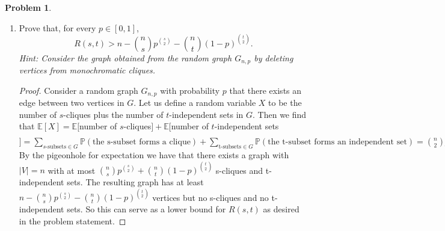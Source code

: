 \documentclass[11pt, letter]{amsart}
\theoremstyle{definition}
\newtheorem{problem}{Problem}[]
\newcommand{\p}[0]{\mathbb{P}}
\begin{document}
\begin{problem}
\begin{enumerate}[label=(\alph*)]
  \item\label{ramsey-deletion} Prove that, for every $p \in [0,1]$,
    \begin{equation*}
      R(s,t) > n - \binom{n}{s}p^{\binom{s}{2}} - \binom{n}{t}(1 - p)^{\binom{t}{2}}.
    \end{equation*}
    \textit{Hint: Consider the graph obtained from the random graph $G_{n,p}$ by deleting vertices from monochromatic cliques.}

    \begin{proof}
        Consider a random graph $G_{n, p}$ with probability $p$ that there exists an edge between two vertices in $G$. Let us define a random variable $X$ to be the number of $s$-cliques plus the number of $t$-independent sets in $G$. Then we find that $\mathbb{E}[X] = \mathbb{E}[$number of $s$-cliques$] + \mathbb{E} [$number of $t$-independent sets$] = \sum_{s\text{-subsets}\in G}\p(\text{the s-subset forms a clique}) + \sum_{\text{t-subsets}\in G}\p(\text{the t-subset forms an independent set}) = \binom{n}{2}p^{\binom{s}{2}} + \binom{n}{t}(1-p)^{\binom{t}{2}}.$ By the pigeonhole for expectation we have that there exists a graph with $|V| = n$ with at most $\binom{n}{s}p^{\binom{s}{2}} + \binom{n}{t}(1-p)^{\binom{t}{2}}$ s-cliques and t-independent sets. The resulting graph has at least $n - \binom{n}{s}p^{\binom{s}{2}} - \binom{n}{t}(1-p)^{\binom{t}{2}}$ vertices but no s-cliques and no t-independent sets. So this can serve as a lower bound for $R(s, t)$ as desired in the problem statement.
    \end{proof}
    
  \end{enumerate}
\end{problem}
\clearpage
\end{document}
